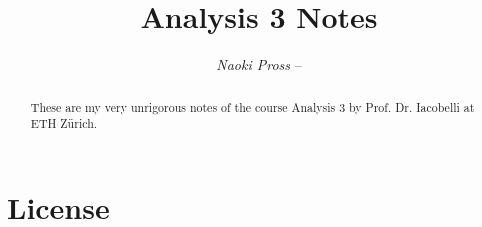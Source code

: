 \documentclass[margin=normal]{tex/hsrzf}
\author{\textsl{Naoki Pross} -- \texttt{\theauthoremail}}
\title{Analysis 3 Notes}
\date{\thesemester}
\begin{document}

\maketitle

\begin{abstract}
  These are my very unrigorous notes of the course Analysis 3 by Prof. Dr.
  Iacobelli at ETH Zürich.
\end{abstract}


\section*{License}
\doclicenseThis

\tableofcontents


\clearpage
\twocolumn 
\setcounter{page}{1}





\appendix


\end{document}
